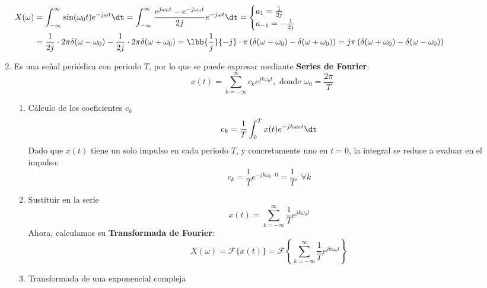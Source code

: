 \begin{enumerate}[label=\color{red}\textbf{\arabic*)}]
$
\begin{aligned}
    X(\omega)&=\int_{-\infty}^{\infty} \sin(\omega_0t)e^{-j\omega t}\dt=\int_{-\infty}^{\infty} \dfrac{e^{j\omega_0t}-e^{-j\omega_0t}  }{2j}e^{-j\omega t}\dt=\begin{cases}
        a_1=\tfrac{1}{2j} \\
        a_{-1}=-\tfrac{1}{2j}
    \end{cases}\\
             &=\dfrac{1}{2j}\cdot 2\pi\delta(\omega-\omega_0)-\dfrac{1}{2j}\cdot 2\pi\delta(\omega+\omega_0)=\lbb{\dfrac{1}{j}}{-j}\cdot \pi\left( \delta(\omega-\omega_0)-\delta(\omega+\omega_0) \right)=j\pi \left( \delta(\omega+\omega_0)-\delta(\omega-\omega_0) \right) \\
\end{aligned}
$
\item {} 
Es una señal periódica con periodo $T$, por lo que se puede expresar mediante  \textbf{Series de Fourier}: \[
x(t)=\sum_{k=-\infty}^{\infty} c_ke^{jk\omega_0t},\text{ donde } \omega_0=\dfrac{2\pi}{T}
\]  
\begin{enumerate}[label=Paso \arabic*:]
    \item Cálculo de los coeficientes $c_k$  \[
    c_k=\dfrac{1}{T}\int_{0}^{T} x(t)e^{-jk\omega_0t}\dt
    \] 
    Dado que $x(t)$ tiene un solo impulso en cada periodo  $T$, y concretamente uno en  $t=0$, la integral se reduce a evaluar en el impulso:  \[
    c_k=\dfrac{1}{T}e^{-jk\omega_0\cdot 0}=\dfrac{1}{T},\:\forall k 
    \] 
\item Sustituir en la serie \[
x(t)=\sum_{k=-\infty}^{\infty} \dfrac{1}{T}e^{jk\omega_0t} 
\] 
Ahora, calculamos su \textbf{Transformada de Fourier}: \[
X(\omega)=\mathcal{F}\{x(t)\} =\mathcal{F}\left\{ \sum_{k=-\infty}^{\infty} \dfrac{1}{T}e^{jk\omega_0t}  \right\} 
\] 
\item Transformada de una exponencial compleja


\end{enumerate}
\end{enumerate}
